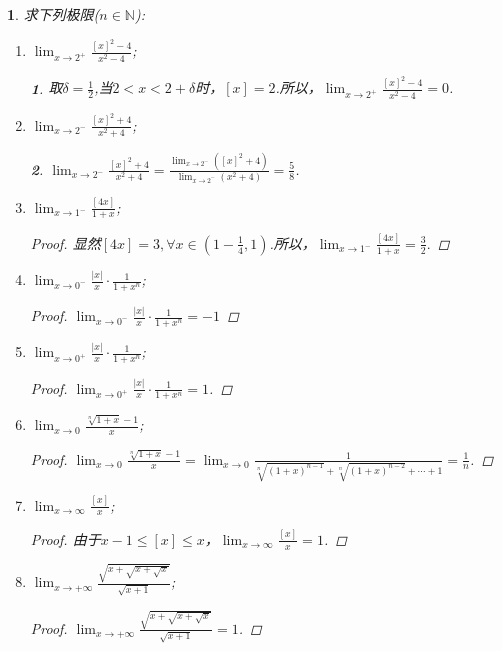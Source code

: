 \documentclass[utf8]{book}
\newtheorem{example}{}[section]             %
\newtheorem{solution}{}
\begin{document}
\begin{example}
求下列极限($n\in\mathbb{N}$):
\renewcommand\labelenumi{\normalfont(\theenumi)}
\begin{enumerate}
\item $\displaystyle\lim_{x\to 2^+}\frac{[x]^2-4}{x^2-4}$;
\begin{solution}取$\delta = \frac{1}{2}$,当$2<x < 2+\delta$时，$[x]=2$.所以，$\displaystyle\lim_{x\to 2^+}\frac{[x]^2-4}{x^2-4}=0$.
\end{solution}
\item $\displaystyle\lim_{x\to 2^-}\frac{[x]^2+4}{x^2+4}$;
\begin{solution}$\displaystyle\lim_{x\to 2^-}\frac{[x]^2+4}{x^2+4}=\frac{\displaystyle\lim_{x\to 2^-}([x]^2+4)}{\displaystyle\lim_{x\to 2^-}(x^2+4)}=\frac{5}{8}$.
\end{solution}
\item $\displaystyle\lim_{x\to 1^-}\frac{[4x]}{1+x}$;
\begin{proof}显然$[4x]=3,\forall x\in (1-\frac{1}{4}, 1)$.所以，$\displaystyle\lim_{x\to 1^-}\frac{[4x]}{1+x}=\frac{3}{2}.$
\end{proof}
\item $\displaystyle\lim_{x\to 0^-}\frac{|x|}{x}\cdot\frac{1}{1+x^n}$;
\begin{proof}
$\displaystyle\lim_{x\to 0^-}\frac{|x|}{x}\cdot\frac{1}{1+x^n}=-1$
\end{proof}
\item $\displaystyle\lim_{x\to 0^+}\frac{|x|}{x}\cdot\frac{1}{1+x^n}$;
\begin{proof}
$\displaystyle\lim_{x\to 0^+}\frac{|x|}{x}\cdot\frac{1}{1+x^n}=1$.
\end{proof}
\item $\displaystyle\lim_{x\to 0}\frac{\sqrt[n]{1+x}-1}{x}$;
\begin{proof}
$\displaystyle\lim_{x\to 0}\frac{\sqrt[n]{1+x}-1}{x}=\displaystyle\lim_{x\to 0}\frac{1}{\sqrt[n]{(1+x)^{n-1}}+\sqrt[n]{(1+x)^{n-2}}+\cdots + 1}=\frac{1}{n}$.
\end{proof}
\item $\displaystyle\lim_{x\to \infty}\frac{[x]}{x}$;
\begin{proof}由于$x-1\leq[x]\leq x$，$\displaystyle\lim_{x\to \infty}\frac{[x]}{x}=1$.
\end{proof}
\item $\displaystyle\lim_{x\to +\infty}\frac{\sqrt{x+\sqrt{x+\sqrt{x}}}}{\sqrt{x+1}}$;
\begin{proof}
$\displaystyle\lim_{x\to +\infty}\frac{\sqrt{x+\sqrt{x+\sqrt{x}}}}{\sqrt{x+1}}=1$.
\end{proof}
\end{enumerate}
\end{example}
\end{document}
